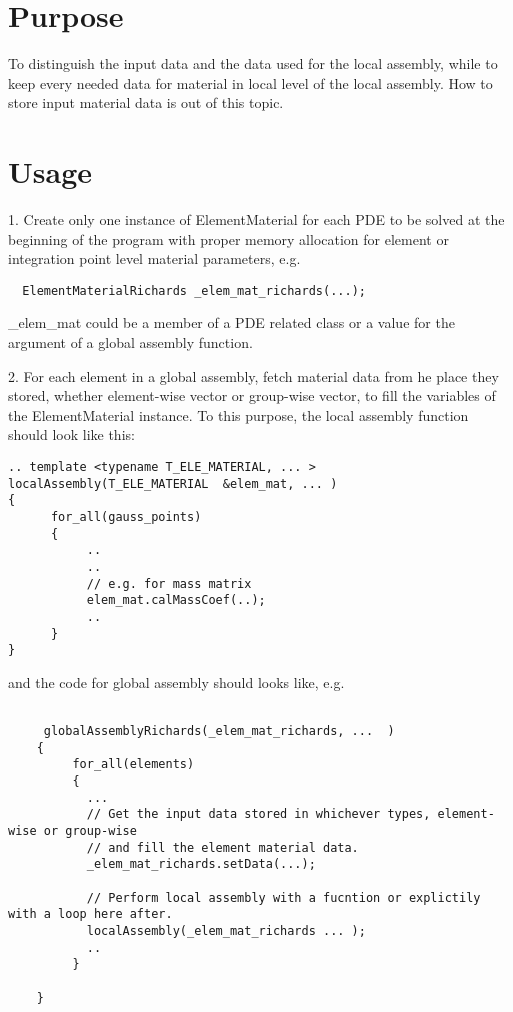 \documentclass[10pt, a4paper]{article}
\begin{document}
\section*{Purpose} To distinguish the input data and the data used for the local assembly, while to keep every needed data for material in local level of the local assembly. How to store input material data is out of this topic.

\section*{Usage}
1. Create only one instance of ElementMaterial for each PDE to be solved at the beginning of the program with proper memory allocation for  element or integration point level material parameters, e.g.
  
 \begin{verbatim}
  ElementMaterialRichards _elem_mat_richards(...); 
 \end{verbatim} 
  
  \_elem\_mat could be a member of a PDE related class or a value for the argument of a global assembly function. 

2. For each element in a global assembly, fetch material data from  he place they stored, whether element-wise vector or group-wise vector, to fill the variables of the ElementMaterial instance. To this purpose, the local assembly function should look like this:

 \begin{verbatim}
.. template <typename T_ELE_MATERIAL, ... > localAssembly(T_ELE_MATERIAL  &elem_mat, ... )
{
      for_all(gauss_points)
      {
           ..
           ..
           // e.g. for mass matrix
           elem_mat.calMassCoef(..);
           ..     
      }
}
 \end{verbatim} 


and the code for global assembly should looks like, e.g.
     

 \begin{verbatim}
  
     globalAssemblyRichards(_elem_mat_richards, ...  )
    {
         for_all(elements)
         {
           ...
           // Get the input data stored in whichever types, element-wise or group-wise
           // and fill the element material data.
           _elem_mat_richards.setData(...);
           
           // Perform local assembly with a fucntion or explictily with a loop here after.
           localAssembly(_elem_mat_richards ... );  
           ..           
         }     
     
    } 
  \end{verbatim} 
\end{document}
